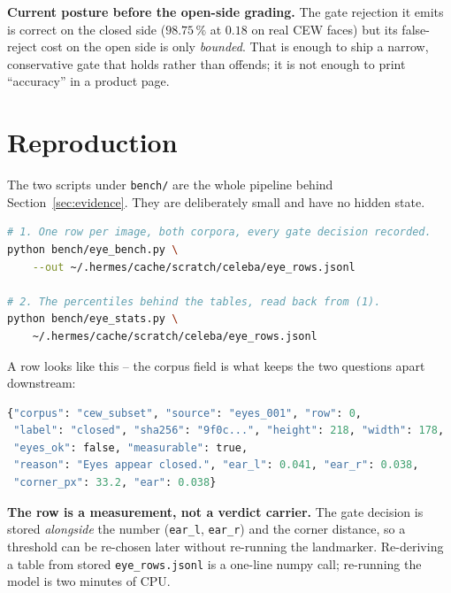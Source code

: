 \documentclass[11pt,a4paper]{article}
\newcommand{\coden}[1]{\texttt{\small #1}}
\begin{document}
\begin{keybox}
\textbf{Current posture before the open-side grading.} The gate rejection it
emits is correct on the closed side ($98.75\,\%$ at $0.18$ on real CEW
faces) but its false-reject cost on the open side is only
\emph{bounded}. That is enough to ship a narrow, conservative gate that
holds rather than offends; it is not enough to print ``accuracy''
in a product page.
\end{keybox}

\section{Reproduction}
\label{sec:repro}

The two scripts under \coden{bench/} are the whole pipeline behind
Section~\ref{sec:evidence}. They are deliberately small and have no
hidden state.

\begin{lstlisting}[language=bash]
# 1. One row per image, both corpora, every gate decision recorded.
python bench/eye_bench.py \
    --out ~/.hermes/cache/scratch/celeba/eye_rows.jsonl

# 2. The percentiles behind the tables, read back from (1).
python bench/eye_stats.py \
    ~/.hermes/cache/scratch/celeba/eye_rows.jsonl
\end{lstlisting}

A row looks like this -- the corpus field is what keeps the two questions
apart downstream:

\begin{lstlisting}[language=Python]
{"corpus": "cew_subset", "source": "eyes_001", "row": 0,
 "label": "closed", "sha256": "9f0c...", "height": 218, "width": 178,
 "eyes_ok": false, "measurable": true,
 "reason": "Eyes appear closed.", "ear_l": 0.041, "ear_r": 0.038,
 "corner_px": 33.2, "ear": 0.038}
\end{lstlisting}

\begin{keybox}
\textbf{The row is a measurement, not a verdict carrier.}   The gate decision is stored \emph{alongside} the number
  (\coden{ear\_l}, \coden{ear\_r}) and the corner distance, so a
  threshold can be re-chosen later without re-running the landmarker.
  Re-deriving a table from stored \coden{eye\_rows.jsonl} is a one-line
  numpy call; re-running the model is two minutes of CPU.
\end{keybox}
\end{document}
